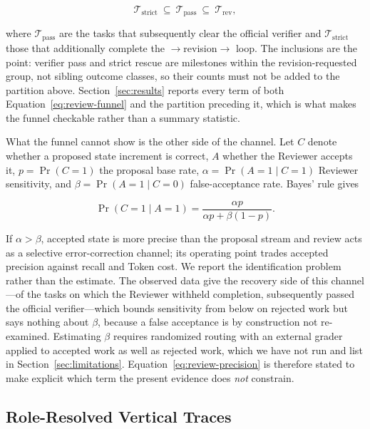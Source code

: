 \begin{equation}
  \mathcal{T}_{\mathrm{strict}}\ \subseteq\
  \mathcal{T}_{\mathrm{pass}}\ \subseteq\
  \mathcal{T}_{\mathrm{rev}},
  \label{eq:review-funnel}
\end{equation}

where $\mathcal{T}_{\mathrm{pass}}$ are the tasks that subsequently clear the
official verifier and $\mathcal{T}_{\mathrm{strict}}$ those that additionally
complete the \code{continue}$\rightarrow$revision$\rightarrow$\code{done} loop. The
inclusions are the point: verifier pass and strict rescue are milestones within the
revision-requested group, not sibling outcome classes, so their counts must not be
added to the partition above. Section~\ref{sec:results} reports every term of both
Equation~\ref{eq:review-funnel} and the partition preceding it, which is what makes
the funnel checkable rather than a summary statistic.

What the funnel cannot show is the other side of the channel. Let $C$ denote whether
a proposed state increment is correct, $A$ whether the
Reviewer accepts it, $p=\Pr(C=1)$ the proposal base rate,
$\alpha=\Pr(A=1\mid C=1)$ Reviewer sensitivity, and
$\beta=\Pr(A=1\mid C=0)$ false-acceptance rate. Bayes' rule gives

\begin{equation}
  \Pr(C=1\mid A=1)
  =\frac{\alpha p}{\alpha p+\beta(1-p)}.
  \label{eq:review-precision}
\end{equation}

If $\alpha>\beta$, accepted state is more precise than the proposal stream and review
acts as a selective error-correction channel; its operating point trades accepted
precision against recall and Token cost. We report the identification problem rather
than the estimate. The observed data give the recovery side of this channel---of the
\ReviewerRevisionRequested{} tasks on which the Reviewer withheld completion,
\ReviewerVerifierRecovered{} subsequently passed the official verifier---which
bounds sensitivity from below on rejected work but says nothing about $\beta$,
because a false acceptance is by construction not re-examined. Estimating $\beta$
requires randomized routing with an external grader applied to accepted work as well
as rejected work, which we have not run and list in
Section~\ref{sec:limitations}. Equation~\ref{eq:review-precision} is therefore stated
to make explicit which term the present evidence does \emph{not} constrain.

\subsection{Role-Resolved Vertical Traces}

